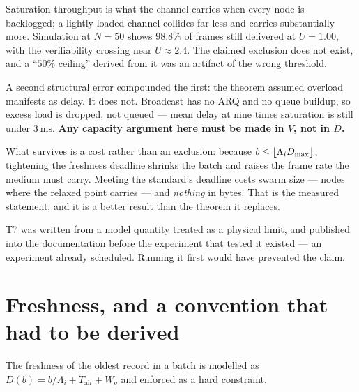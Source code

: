 Saturation throughput is what the channel carries when every node is backlogged; a lightly loaded
channel collides far less and carries substantially more. Simulation at $N = 50$ shows $98.8\%$ of
frames still delivered at $U = 1.00$, with the verifiability crossing near $U \approx 2.4$. The
claimed exclusion does not exist, and a ``$50\%$ ceiling'' derived from it was an artifact of the
wrong threshold.

A second structural error compounded the first: the theorem assumed overload manifests as delay. It
does not. Broadcast has no ARQ and no queue buildup, so excess load is dropped, not queued --- mean
delay at nine times saturation is still under $\SI{3}{\milli\second}$. \textbf{Any capacity
argument here must be made in $V$, not in $D$.}

What survives is a cost rather than an exclusion: because $b \leq \lfloor \Lambda_i D_{\max} \rfloor$,
tightening the freshness deadline shrinks the batch and raises the frame rate the medium must
carry. Meeting the standard's deadline costs swarm size --- \nmaxLeanDesign{} nodes where the
relaxed point carries \nmaxRelLeanDesign{} --- and \emph{nothing} in bytes. That is the measured
statement, and it is a better result than the theorem it replaces.

\begin{remark}
T7 was written from a model quantity treated as a physical limit, and published into the
documentation before the experiment that tested it existed --- an experiment already scheduled.
Running it first would have prevented the claim.
\end{remark}

\section{Freshness, and a convention that had to be derived}\label{sec:freshness-convention}

The freshness of the oldest record in a batch is modelled as
$D(b) = b/\Lambda_i + T_{\mathrm{air}} + W_q$ and enforced as a hard constraint.

